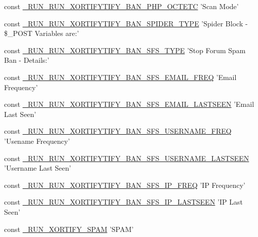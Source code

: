 \begin{DoxyCompactItemize}
const \hyperlink{constants_8php_a3a5e11c34b7b615250752239c86a91b4}{\-\_\-\-R\-U\-N\-\_\-\-R\-U\-N\-\_\-\-X\-O\-R\-T\-I\-F\-Y\-T\-I\-F\-Y\-\_\-\-B\-A\-N\-\_\-\-P\-H\-P\-\_\-\-O\-C\-T\-E\-T\-C} 'Scan Mode'
\item 
const \hyperlink{constants_8php_a40531df557fe325213d999f4008e4853}{\-\_\-\-R\-U\-N\-\_\-\-R\-U\-N\-\_\-\-X\-O\-R\-T\-I\-F\-Y\-T\-I\-F\-Y\-\_\-\-B\-A\-N\-\_\-\-S\-P\-I\-D\-E\-R\-\_\-\-T\-Y\-P\-E} 'Spider Block -\/ \$\-\_\-\-P\-O\-S\-T Variables are\-:'
\item 
const \hyperlink{constants_8php_a35b6aceb1089d6c47683bf8fb8664430}{\-\_\-\-R\-U\-N\-\_\-\-R\-U\-N\-\_\-\-X\-O\-R\-T\-I\-F\-Y\-T\-I\-F\-Y\-\_\-\-B\-A\-N\-\_\-\-S\-F\-S\-\_\-\-T\-Y\-P\-E} 'Stop Forum Spam Ban -\/ Details\-:'
\item 
const \hyperlink{constants_8php_a569cbf4736b90e7cc7354d9dbd190639}{\-\_\-\-R\-U\-N\-\_\-\-R\-U\-N\-\_\-\-X\-O\-R\-T\-I\-F\-Y\-T\-I\-F\-Y\-\_\-\-B\-A\-N\-\_\-\-S\-F\-S\-\_\-\-E\-M\-A\-I\-L\-\_\-\-F\-R\-E\-Q} 'Email Frequency'
\item 
const \hyperlink{constants_8php_aee1aac0ae0321b9d930a6f706ca25add}{\-\_\-\-R\-U\-N\-\_\-\-R\-U\-N\-\_\-\-X\-O\-R\-T\-I\-F\-Y\-T\-I\-F\-Y\-\_\-\-B\-A\-N\-\_\-\-S\-F\-S\-\_\-\-E\-M\-A\-I\-L\-\_\-\-L\-A\-S\-T\-S\-E\-E\-N} 'Email Last Seen'
\item 
const \hyperlink{constants_8php_a5f3f317cea92211f3da142bcfcbaad8c}{\-\_\-\-R\-U\-N\-\_\-\-R\-U\-N\-\_\-\-X\-O\-R\-T\-I\-F\-Y\-T\-I\-F\-Y\-\_\-\-B\-A\-N\-\_\-\-S\-F\-S\-\_\-\-U\-S\-E\-R\-N\-A\-M\-E\-\_\-\-F\-R\-E\-Q} 'Usename Frequency'
\item 
const \hyperlink{constants_8php_a26748d7e6587717921ca73ee251eed2a}{\-\_\-\-R\-U\-N\-\_\-\-R\-U\-N\-\_\-\-X\-O\-R\-T\-I\-F\-Y\-T\-I\-F\-Y\-\_\-\-B\-A\-N\-\_\-\-S\-F\-S\-\_\-\-U\-S\-E\-R\-N\-A\-M\-E\-\_\-\-L\-A\-S\-T\-S\-E\-E\-N} 'Username Last Seen'
\item 
const \hyperlink{constants_8php_aba9ca546e6430465b003b1efba9aa2f3}{\-\_\-\-R\-U\-N\-\_\-\-R\-U\-N\-\_\-\-X\-O\-R\-T\-I\-F\-Y\-T\-I\-F\-Y\-\_\-\-B\-A\-N\-\_\-\-S\-F\-S\-\_\-\-I\-P\-\_\-\-F\-R\-E\-Q} 'I\-P Frequency'
\item 
const \hyperlink{constants_8php_a3172780ba6ee1f4bf033dbe8940626e6}{\-\_\-\-R\-U\-N\-\_\-\-R\-U\-N\-\_\-\-X\-O\-R\-T\-I\-F\-Y\-T\-I\-F\-Y\-\_\-\-B\-A\-N\-\_\-\-S\-F\-S\-\_\-\-I\-P\-\_\-\-L\-A\-S\-T\-S\-E\-E\-N} 'I\-P Last Seen'
\item 
const \hyperlink{constants_8php_ac9e326eff0f95feb5bc23e911000ad87}{\-\_\-\-R\-U\-N\-\_\-\-X\-O\-R\-T\-I\-F\-Y\-\_\-\-S\-P\-A\-M} 'S\-P\-A\-M'

\end{DoxyCompactItemize}
